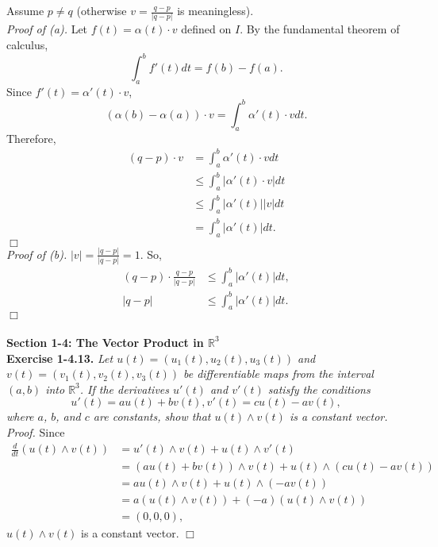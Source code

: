 \documentclass{article}
\begin{document}
Assume $p \neq q$ (otherwise $v = \frac{q-p}{|q-p|}$ is meaningless). \\

\emph{Proof of (a).}
Let $f(t) = \alpha(t) \cdot v$ defined on $I$.
By the fundamental theorem of calculus,
$$\int_{a}^{b} f'(t) dt = f(b) - f(a).$$
Since $f'(t) = \alpha'(t) \cdot v$,
$$(\alpha(b) - \alpha(a)) \cdot v = \int_{a}^{b} \alpha'(t) \cdot v dt.$$
Therefore,
\begin{align*}
(q - p) \cdot v
&= \int_{a}^{b} \alpha'(t) \cdot v dt \\
&\leq \int_{a}^{b} |\alpha'(t) \cdot v| dt \\
&\leq \int_{a}^{b} |\alpha'(t)||v| dt \\
&= \int_{a}^{b} |\alpha'(t)| dt.
\end{align*}
$\Box$ \\

\emph{Proof of (b).}
$|v| = \frac{|q-p|}{|q-p|} = 1$.
So,
\begin{align*}
(q-p) \cdot \frac{q-p}{|q-p|}
&\leq \int_{a}^{b} |\alpha'(t)| dt, \\
|q-p|
&\leq \int_{a}^{b} |\alpha'(t)| dt.
\end{align*}
$\Box$ \\\\






\textbf{\large Section 1-4: The Vector Product in $\mathbb{R}^{3}$} \\

\textbf{Exercise 1-4.13.}
\emph{Let $u(t) = (u_1(t), u_2(t), u_3(t))$ and $v(t) = (v_1(t), v_2(t), v_3(t))$
be differentiable maps from the interval $(a,b)$ into $\mathbb{R}^3$.
If the derivatives $u'(t)$ and $v'(t)$ satisfy the conditions
$$u'(t) = au(t) + bv(t), v'(t) = cu(t) - av(t),$$
where $a$, $b$, and $c$ are constants, show that
$u(t) \wedge v(t)$ is a constant vector.} \\

\emph{Proof.}
Since
\begin{align*}
  \frac{d}{dt}(u(t) \wedge v(t))
  &= u'(t) \wedge v(t) + u(t) \wedge v'(t) \\
  &= (au(t) + bv(t))\wedge v(t) + u(t) \wedge (cu(t) - av(t)) \\
  &= au(t) \wedge v(t) + u(t) \wedge (-av(t)) \\
  &= a(u(t) \wedge v(t)) + (-a)(u(t) \wedge v(t)) \\
  &= (0, 0, 0),
\end{align*}
$u(t) \wedge v(t)$ is a constant vector.
$\Box$ \\\\
\end{document}
